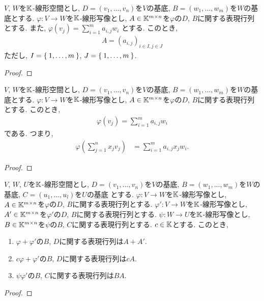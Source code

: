 \begin{prop}
  $V$, $W$を$\mathbb{K}$-線形空間とし,
  $D=(v_1,\ldots,v_n)$を$V$の基底,
  $B=(w_1,\ldots,w_m)$を$W$の基底とする.
  $\varphi\colon V\to W$を$\mathbb{K}$-線形写像とし,
  $A\in\mathbb{K}^{m\times n}$を$\varphi$の$D$, $B$に関する表現行列とする.
  また,
  $\varphi(v_j)=\sum_{i=1}^m a_{i,j} w_i$
  とする.
  このとき,
\begin{align*}
  A=(a_{i,j})_{i\in I, j\in J}
\end{align*}
ただし,
$I=\Set{1,\ldots,m}$,
$J=\Set{1,\ldots,m}$.
\end{prop}
\begin{proof}\end{proof}


\begin{prop}
  $V$, $W$を$\mathbb{K}$-線形空間とし,
  $D=(v_1,\ldots,v_n)$を$V$の基底,
  $B=(w_1,\ldots,w_m)$を$W$の基底とする.
  $\varphi\colon V\to W$を$\mathbb{K}$-線形写像とし,
  $A\in\mathbb{K}^{m\times n}$を$\varphi$の$D$, $B$に関する表現行列とする.
このとき,
\begin{align*}
  \varphi(v_j)=\sum_{i=1}^m a_{i,j}w_i
\end{align*}
である.
つまり,
\begin{align*}
  \varphi(\sum_{j=1}^n x_j v_j)
  &=\sum_{i=1}^m a_{i,j}x_jw_i.
\end{align*}
\end{prop}
\begin{proof}\end{proof}


\begin{prop}
  $V$, $W$, $U$を$\mathbb{K}$-線形空間とし,
  $D=(v_1,\ldots,v_n)$を$V$の基底,
  $B=(w_1,\ldots,w_m)$を$W$の基底,
  $C=(u_1,\ldots,u_l)$を$U$の基底
  とする.
  $\varphi\colon V\to W$を$\mathbb{K}$-線形写像とし,
  $A\in\mathbb{K}^{m\times n}$を$\varphi$の$D$, $B$に関する表現行列とする.
  $\varphi'\colon V\to W$を$\mathbb{K}$-線形写像とし,
  $A'\in\mathbb{K}^{m\times n}$を$\varphi'$の$D$, $B$に関する表現行列とする.
  $\psi\colon W\to U$を$\mathbb{K}$-線形写像とし,
  $B\in\mathbb{K}^{m\times n}$を$\psi$の$B$, $C$に関する表現行列とする.
  $c\in \mathbb{K}$とする.
このとき,
\begin{enumerate}
  \item $\varphi+\varphi'$の$B$, $D$に関する表現行列は$A+A'$.
  \item $c\varphi+\varphi'$の$B$, $D$に関する表現行列は$cA$.
  \item $\psi\varphi'$の$B$, $C$に関する表現行列は$BA$.
\end{enumerate}
\end{prop}
\begin{proof}\end{proof}



